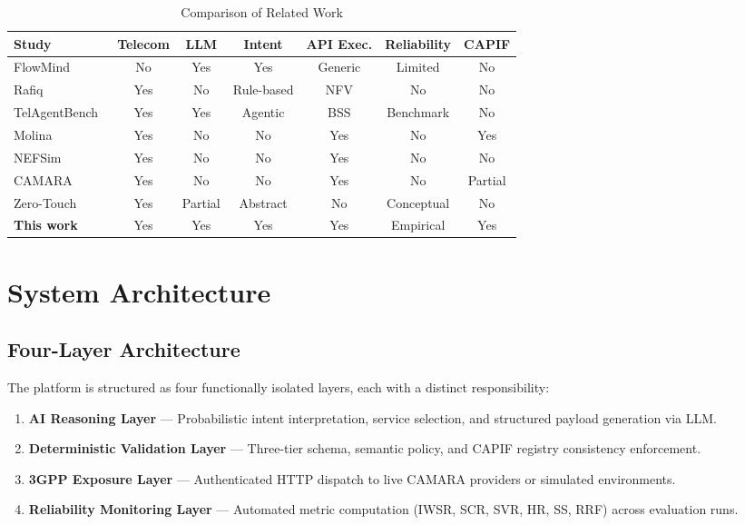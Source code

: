 \documentclass[conference]{IEEEtran}
\begin{document}
\begin{table}[H]
\centering
\caption{Comparison of Related Work}
\label{tab:related}
\scriptsize
\begin{tabular}{lcccccc}
\toprule
\textbf{Study} & \textbf{Telecom} & \textbf{LLM} & \textbf{Intent} &
\textbf{API Exec.} & \textbf{Reliability} & \textbf{CAPIF} \\
\midrule
FlowMind~\cite{flowmind2023}          & No  & Yes     & Yes       & Generic & Limited     & No  \\
Rafiq~\cite{rafiq2020}               & Yes & No      & Rule-based & NFV    & No          & No  \\
TelAgentBench~\cite{telagentbench2025} & Yes & Yes    & Agentic   & BSS     & Benchmark   & No  \\
Molina~\cite{molina2022}              & Yes & No      & No        & Yes     & No          & Yes \\
NEFSim~\cite{nefsim2022}              & Yes & No      & No        & Yes     & No          & No  \\
CAMARA~\cite{camara2022}              & Yes & No      & No        & Yes     & No          & Partial \\
Zero-Touch~\cite{coronado2022}        & Yes & Partial & Abstract  & No      & Conceptual  & No  \\
\textbf{This work}                    & Yes & Yes     & Yes       & Yes     & Empirical   & Yes \\
\bottomrule
\end{tabular}
\end{table}

\section{System Architecture}
\label{sec:architecture}

\subsection{Four-Layer Architecture}

The platform is structured as four functionally isolated layers, each with
a distinct responsibility:

\begin{enumerate}[leftmargin=1.5em]
  \item \textbf{AI Reasoning Layer} — Probabilistic intent interpretation,
        service selection, and structured payload generation via LLM.
  \item \textbf{Deterministic Validation Layer} — Three-tier schema,
        semantic policy, and CAPIF registry consistency enforcement.
  \item \textbf{3GPP Exposure Layer} — Authenticated HTTP dispatch to live
        CAMARA providers or simulated environments.
  \item \textbf{Reliability Monitoring Layer} — Automated metric computation
        (IWSR, SCR, SVR, HR, SS, RRF) across evaluation runs.
\end{enumerate}
\end{document}
